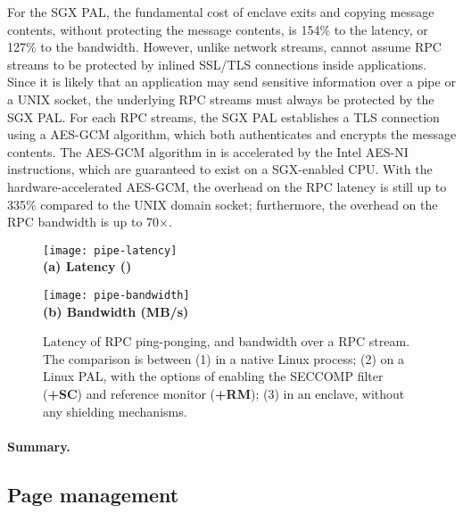 For the SGX PAL,
the fundamental cost of enclave exits and copying message contents,
without protecting the message contents,
is \roughly{}154\% to the latency,
or \roughly{}127\% to the bandwidth.
However, unlike network streams, \graphenesgx{} cannot assume RPC streams to be protected by inlined SSL/TLS connections
inside applications.
Since it is likely that an application may send sensitive information
over a pipe or a UNIX socket,
the underlying RPC streams must always be protected by the SGX PAL.
For each RPC streams, the SGX PAL establishes a TLS connection using a AES-GCM algorithm, which both authenticates and encrypts the message contents.
The AES-GCM algorithm in \graphenesgx{} is accelerated by the Intel AES-NI instructions, which are guaranteed to exist on a SGX-enabled CPU.
With the hardware-accelerated AES-GCM,
the overhead on the RPC latency is still up to \roughly{}335\% compared to the UNIX domain socket;
furthermore, the overhead on the RPC bandwidth
is up to \roughly{}70$\times$.



\begin{figure*}[t!]
\centering
\footnotesize
\begin{minipage}{.49\linewidth}
\centering
\texttt{[image: pipe-latency]}\\
{\bf (a) Latency (\usec{})}
\vspace{6pt}
\end{minipage}
\begin{minipage}{.49\linewidth}
\centering
\texttt{[image: pipe-bandwidth]}\\
{\bf (b) Bandwidth (MB/s)}
\vspace{6pt}
\end{minipage}
\caption{Latency of RPC ping-ponging, and bandwidth over a RPC stream.
The comparison is between (1) \linuxapis{} in a native Linux process; (2) \hostapis{} on a Linux PAL, with the options of enabling the SECCOMP filter ({\bf +SC}) and reference monitor ({\bf +RM}); (3) \hostapis{} in an enclave, without any shielding mechanisms.}
\label{fig:eval:pal:pipe-latency-bandwidth}
\end{figure*}


\paragraph{Summary.}




\subsection{Page management}























